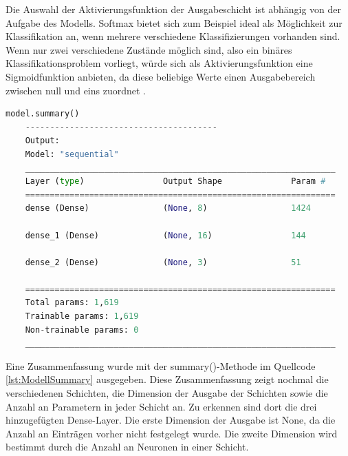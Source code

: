 Die Auswahl der Aktivierungsfunktion der Ausgabeschicht ist abhängig von der Aufgabe des Modells. 
\glqq Softmax\grqq{} bietet sich zum Beispiel ideal als Möglichkeit zur Klassifikation an, wenn mehrere verschiedene Klassifizierungen vorhanden sind. Wenn nur zwei verschiedene Zustände möglich sind, also ein binäres Klassifikationsproblem vorliegt, würde sich als Aktivierungsfunktion
eine Sigmoidfunktion anbieten, da diese beliebige Werte einen Ausgabebereich zwischen null und eins zuordnet \cite[vgl. S.100]{DL_PY}.

\begin{lstlisting}[language = python, caption={Zusammenfassung des Modells},captionpos=b, label = lst:ModellSummary, float, floatplacement=H]
    model.summary()
    ---------------------------------------
    Output:
    Model: "sequential"
    _______________________________________________________________
    Layer (type)                Output Shape              Param #   
    ===============================================================
    dense (Dense)               (None, 8)                 1424      
                                                                    
    dense_1 (Dense)             (None, 16)                144       
                                                                    
    dense_2 (Dense)             (None, 3)                 51        
                                                                    
    ===============================================================
    Total params: 1,619
    Trainable params: 1,619
    Non-trainable params: 0
    _______________________________________________________________
\end{lstlisting}
Eine Zusammenfassung wurde mit der summary()-Methode im Quellcode \ref{lst:ModellSummary} ausgegeben. 
Diese Zusammenfassung zeigt nochmal die verschiedenen Schichten, die Dimension der Ausgabe der Schichten sowie die Anzahl an Parametern in jeder Schicht an. 
Zu erkennen sind dort die drei hinzugefügten Dense-Layer. Die erste Dimension der Ausgabe ist \glqq None\grqq{}, da die Anzahl an Einträgen vorher nicht festgelegt wurde. 
Die zweite Dimension wird bestimmt durch die Anzahl an Neuronen in einer Schicht.\\

